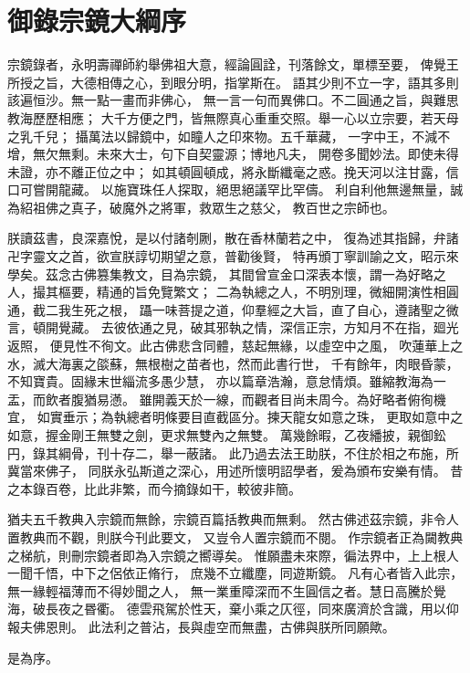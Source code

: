 
\clearpage
\section*{御錄宗鏡大綱序}



宗鏡錄者，永明壽禪師約舉佛祖大意，經論圓詮，刊落餘文，單標至要，
俾覺王所授之旨，大德相傳之心，到眼分明，指掌斯在。
語其少則不立一字，語其多則該遍恒沙。無一點一畫而非佛心，
無一言一句而異佛口。不二圓通之旨，與難思教海歷歷相應；
大千方便之門，皆無際真心重重交照。舉一心以立宗要，若天母之乳千兒；
攝萬法以歸鏡中，如瞳人之印來物。五千華藏，
一字中王，不減不增，無欠無剩。未來大士，句下自契靈源；博地凡夫，
開卷多聞妙法。即使未得未證，亦不離正位之中；
如其頓圓頓成，將永斷纖毫之惑。挽天河以注甘露，信口可嘗開龍藏。
以施寶珠任人探取，絕思絕議罕比罕儔。
利自利他無邊無量，誠為紹祖佛之真子，破魔外之將軍，救眾生之慈父，
教百世之宗師也。

朕讀茲書，良深嘉悅，是以付諸剞劂，散在香林蘭若之中，
復為述其指歸，弁諸卍字靈文之首，欲宣朕諄切期望之意，普勸後賢，
特再頒丁寧訓諭之文，昭示來學矣。茲念古佛篡集教文，目為宗鏡，
其間曾宣金口深表本懷，謂一為好略之人，撮其樞要，精通的旨免覽繁文；
二為執總之人，不明別理，微細開演性相圓通，截二我生死之根，
躡一味菩提之道，仰羣經之大旨，直了自心，遵諸聖之微言，頓開覺藏。
去彼依通之見，破其邪執之情，深信正宗，方知月不在指，廻光返照，
便見性不徇文。此古佛悲含同體，慈起無緣，以虛空中之風，
吹蓮華上之水，滅大海裏之燄蘇，無根樹之苗者也，然而此書行世，
千有餘年，肉眼昏蒙，不知寶貴。固緣末世緇流多愚少慧，
亦以篇章浩瀚，意怠情煩。雖縮教海為一盂，而飲者腹猶易懣。
雖開義天於一線，而觀者目尚未周今。為好略者俯徇機宜，
如實垂示；為執總者明條要目直截區分。揀天龍女如意之珠，
更取如意中之如意，握金剛王無雙之劍，更求無雙內之無雙。
萬幾餘暇，乙夜繙披，親御鈆円，錄其綱骨，刊十存二，舉一蔽諸。
此乃過去法王助朕，不住於相之布施，所冀當來佛子，
同朕永弘斯道之深心，用述所懷明詔學者，爰為頒布安樂有情。
昔之本錄百卷，比此非繁，而今摘錄如干，較彼非簡。


猶夫五千教典入宗鏡而無餘，宗鏡百篇括教典而無剩。
然古佛述茲宗鏡，非令人置教典而不觀，則朕今刊此要文，
又豈令人置宗鏡而不閱。
作宗鏡者正為闚教典之梯航，則刪宗鏡者即為入宗鏡之嚮導矣。
惟願盡未來際，徧法界中，上上根人一聞千悟，中下之侶依正脩行，
庶幾不立纖塵，同遊斯鏡。
凡有心者皆入此宗，無一緣輕福薄而不得妙聞之人，
無一業重障深而不生圓信之者。慧日高騰於覺海，破長夜之昬衢。
德雲飛駕於性天，棄小乘之仄徑，同來廣濟於含識，用以仰報夫佛恩則。
此法利之普沾，長與虛空而無盡，古佛與朕所同願歟。

是為序。


\begin{p/b/v/V/B/smallmatrix}
	
\end{p/b/v/V/B/smallmatrix}
